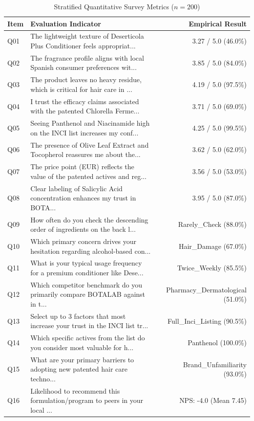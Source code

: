 \documentclass[10pt,twocolumn,a4paper]{article}
\begin{document}
\begin{table}[t]
\centering
\caption{Stratified Quantitative Survey Metrics ($n = 200$)}
\label{tab:metrics}
\small
\begin{tabularx}{\textwidth}{l X r}
\toprule
\textbf{Item} & \textbf{Evaluation Indicator} & \textbf{Empirical Result} \\
\midrule
Q01 & The lightweight texture of Deserticola Plus Conditioner feels appropriat... & 3.27 / 5.0 (46.0\%) \\
Q02 & The fragrance profile aligns with local Spanish consumer preferences wit... & 3.85 / 5.0 (84.0\%) \\
Q03 & The product leaves no heavy residue, which is critical for hair care in ... & 4.19 / 5.0 (97.5\%) \\
Q04 & I trust the efficacy claims associated with the patented Chlorella Ferme... & 3.71 / 5.0 (69.0\%) \\
Q05 & Seeing Panthenol and Niacinamide high on the INCI list increases my conf... & 4.25 / 5.0 (99.5\%) \\
Q06 & The presence of Olive Leaf Extract and Tocopherol reassures me about the... & 3.62 / 5.0 (62.0\%) \\
Q07 & The price point (EUR) reflects the value of the patented actives and reg... & 3.56 / 5.0 (53.0\%) \\
Q08 & Clear labeling of Salicylic Acid concentration enhances my trust in BOTA... & 3.95 / 5.0 (87.0\%) \\
Q09 & How often do you check the descending order of ingredients on the back l... & Rarely\_Check (88.0\%) \\
Q10 & Which primary concern drives your hesitation regarding alcohol-based con... & Hair\_Damage (67.0\%) \\
Q11 & What is your typical usage frequency for a premium conditioner like Dese... & Twice\_Weekly (85.5\%) \\
Q12 & Which competitor benchmark do you primarily compare BOTALAB against in t... & Pharmacy\_Dermatological (51.0\%) \\
Q13 & Select up to 3 factors that most increase your trust in the INCI list tr... & Full\_Inci\_Listing (90.5\%) \\
Q14 & Which specific actives from the list do you consider most valuable for h... & Panthenol (100.0\%) \\
Q15 & What are your primary barriers to adopting new patented hair care techno... & Brand\_Unfamiliarity (93.0\%) \\
Q16 & Likelihood to recommend this formulation/program to peers in your local ... & NPS: -4.0 (Mean 7.45) \\
\bottomrule
\end{tabularx}
\end{table}
\end{document}
